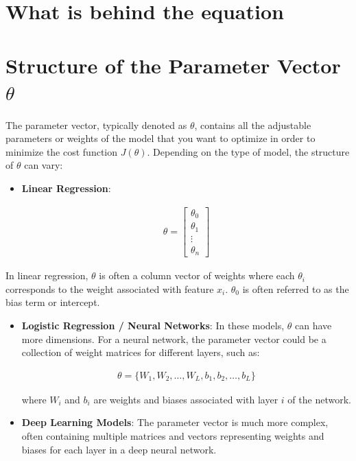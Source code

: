 \documentclass[
  12 pt,
  a4paper,
]{book}
\numberwithin{equation}{section}
\theoremstyle{plain}      %
\theoremstyle{definition} %
\theoremstyle{remark}     %
\theoremstyle{note}         %
\begin{document}
\vspace*{\fill}

\newpage

\hypertarget{what-is-behind-the-equation}{%
\section{What is behind the
equation}\label{what-is-behind-the-equation}}

\hypertarget{structure-of-the-parameter-vector-theta}{%
\section{\texorpdfstring{Structure of the Parameter Vector
\(\theta\)}{Structure of the Parameter Vector \textbackslash theta}}\label{structure-of-the-parameter-vector-theta}}

The parameter vector, typically denoted as \(\theta\), contains all the
adjustable parameters or weights of the model that you want to optimize
in order to minimize the cost function \(J(\theta)\). Depending on the
type of model, the structure of \(\theta\) can vary:

\begin{itemize}
\item
  \textbf{Linear Regression}:

  \begin{align}
  \theta = 
  \begin{bmatrix}
  \theta_0 \\
  \theta_1 \\
  \vdots \\
  \theta_n
  \end{bmatrix}
  \end{align}
\end{itemize}

In linear regression, \(\theta\) is often a column vector of weights
where each \(\theta_i\) corresponds to the weight associated with
feature \(x_i\). \(\theta_0\) is often referred to as the bias term or
intercept.

\begin{itemize}
\item
  \textbf{Logistic Regression / Neural Networks}: In these models,
  \(\theta\) can have more dimensions. For a neural network, the
  parameter vector could be a collection of weight matrices for
  different layers, such as:

  \begin{align}
  \theta = \{ W_1, W_2, \ldots, W_L, b_1, b_2, \ldots, b_L \}
  \end{align}

  where \(W_i\) and \(b_i\) are weights and biases associated with layer
  \(i\) of the network.
\item
  \textbf{Deep Learning Models}: The parameter vector is much more
  complex, often containing multiple matrices and vectors representing
  weights and biases for each layer in a deep neural network.
\end{itemize}
\end{document}
